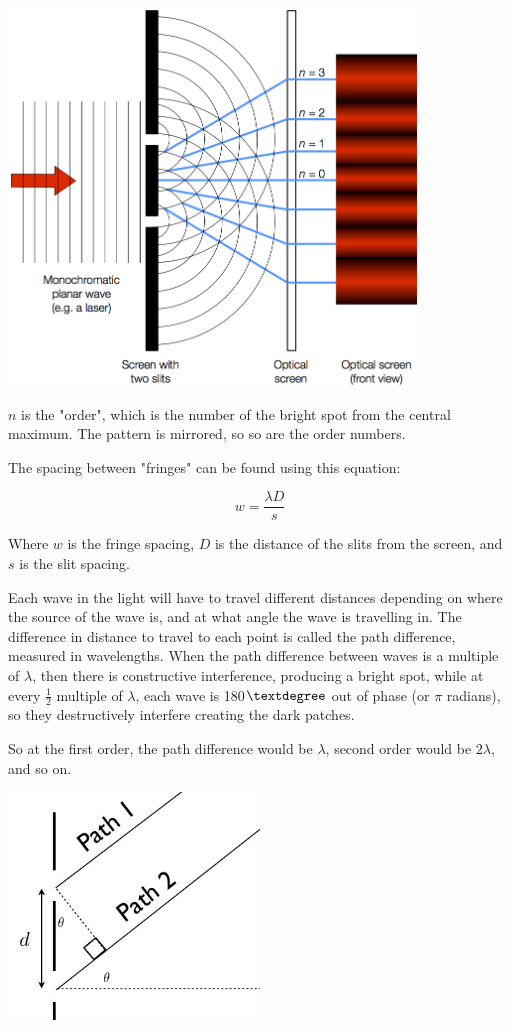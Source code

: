 \documentclass[a4paper, 12pt]{article}
\begin{document}
\begin{center}
\includegraphics[height=10cm]{images/Double-slit-diffraction-diagram.png}
\end{center}

$n$ is the "order", which is the number of the bright spot from the central maximum. The pattern is mirrored, so so are the order numbers.

The spacing between "fringes" can be found using this equation:

$$
w = \frac{{\lambda}D}{s}
$$

Where $w$ is the fringe spacing, $D$ is the distance of the slits from the screen, and $s$ is the slit spacing. 

Each wave in the light will have to travel different distances depending on where the source of the wave is, and at what angle the wave is travelling in. The difference in distance to travel to each point is called the path difference, measured in wavelengths. When the path difference between waves is a multiple of $\lambda$, then there is constructive interference, producing a bright spot, while at every $\frac{1}{2}$ multiple of $\lambda$, each wave is 180$\textdegree$ out of phase (or $\pi$ radians), so they destructively interfere creating the dark patches.

So at the first order, the path difference would be $\lambda$, second order would be $2{\lambda}$, and so on.

\begin{center}
\includegraphics[width=0.5\textwidth]{images/pathDifference.jpg}
\end{center}
\end{document}
